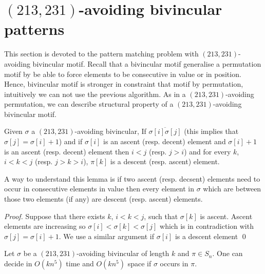 \documentclass[a4paper]{llncs}
\newcommand{\pmotif}{\sigma}
\begin{document}
\section{$(213,231)$-avoiding bivincular patterns}
	\label{section:bivincular}

This section is devoted to the pattern matching problem with $(213,231)$-avoiding bivincular motif.
Recall that a bivincular motif generalise a permutation motif by
be able to force elements to be consecutive in value or in position.
Hence,  bivincular motif is stronger in constraint that motif by permutation, intuitively we can not use the previous algorithm.
As in a $(213,231)$-avoiding permutation, we can describe structural property of a $(213,231)$-avoiding bivincular motif.

\begin{lemma}
\label{lemma:ascentDescentAscent}
Given $\pmotif$ a $(213,231)$-avoiding bivincular,
If $\overline{\sigma[i]\sigma[j]}$ (this implies that $\sigma[j]=\sigma[i]+1$) and 
if $\sigma[i]$ is an ascent (resp. decent) element and $\sigma[i]+1$ is an ascent 
(resp. decent) element then 
$i<j$ (resp. $j>i$) and for every $k$, $i<k<j$ (resp. $j>k>i$), $\pi[k]$ is a descent 
(resp. ascent) element.    
\end{lemma}

A way to understand this lemma is if two ascent (resp. decsent) elements
need to occur in consecutive elements in value then every element in $\pmotif$ which are between those two elements (if any) are descent (resp. ascent) elements. 

\begin{proof}
Suppose that there exists $k$, $i<k<j$,
such that $\pmotif[k]$ is ascent. Ascent elements are increasing  so $\sigma[i]<\sigma[k]<\sigma[j]$ which is in contradiction with $\sigma[j]=\sigma[i]+1$.
We use a similar argument if $\sigma[i]$ is a descent element
\qed
\end{proof}

\begin{proposition}
\label{Proposition:bivincular pattern}
Let $\sigma$ be a $(213,231)$-avoiding bivincular of length $k$
and $\pi \in S_n$.
One can decide in $O(kn^5)$ time
and $O(kn^5)$ space if $\sigma$ occurs in $\pi$.
\end{proposition}
\end{document}
